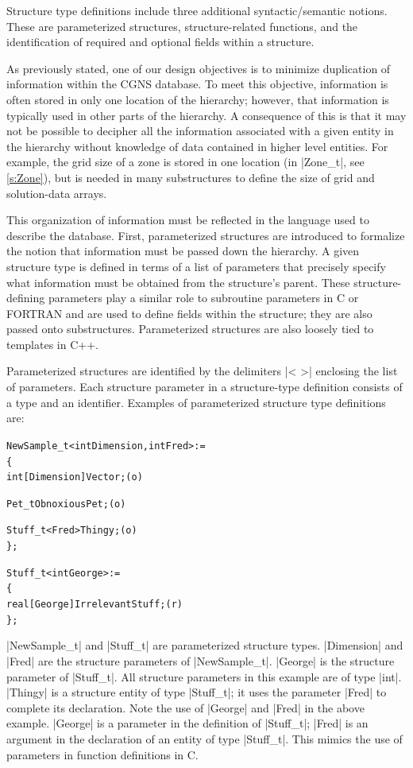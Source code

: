 {{{Structure type definitions include three additional syntactic/semantic
notions.
These are parameterized structures, structure-related functions, and the
identification of required and optional fields within a structure.

As previously stated, one of our design objectives is to minimize
duplication of information within the CGNS database.  To meet this
objective, information is often stored in only one location of the
hierarchy; however, that information is typically used in other parts
of the hierarchy.  A consequence of this is that it may not be possible
to decipher all the information associated with a given entity in the
hierarchy without knowledge of data contained in higher level entities.
For example, the grid size of a zone is stored in one location (in
|Zone_t|, see \autoref{s:Zone}), but is needed in many substructures to
define the size of grid and solution-data arrays.

This organization of information must be reflected in the language
used to describe the database.  First, parameterized structures are
introduced to formalize the notion that information must be passed down
the hierarchy.  A given structure type is defined in terms of a list
of parameters that precisely specify what information must be obtained
from the structure's parent.  These structure-defining parameters
play a similar role to subroutine parameters in C or FORTRAN and are
used to define fields within the structure; they are also passed onto
substructures.  Parameterized structures are also loosely tied to
templates in C++.

Parameterized structures are identified by the delimiters |< >|
enclosing the list of parameters.
Each structure parameter in a structure-type definition consists of a
type and an identifier.
Examples of parameterized structure type definitions are:
\begin{alltt}
  NewSample\_t< int Dimension, int Fred > :=
    \{
    int[Dimension] Vector ;                                                 (o)

    Pet\_t ObnoxiousPet ;                                                    (o)

    Stuff\_t<Fred> Thingy ;                                                  (o)
    \} ;

  Stuff\_t< int George > :=
    \{
    real[George] IrrelevantStuff ;                                          (r)
    \} ;
\end{alltt}
|NewSample_t| and |Stuff_t| are parameterized structure types.  |Dimension|
and |Fred| are the structure parameters of |NewSample_t|.  |George| is the
structure parameter of |Stuff_t|.  All structure parameters in this example
are of type |int|.  |Thingy| is a structure entity of type |Stuff_t|; it uses
the parameter |Fred| to complete its declaration.  Note the use of |George|
and |Fred| in the above example.  |George| is a parameter in the definition
of |Stuff_t|; |Fred| is an argument in the declaration of an entity of type
|Stuff_t|.  This mimics the use of parameters in function definitions in C.

}}}
